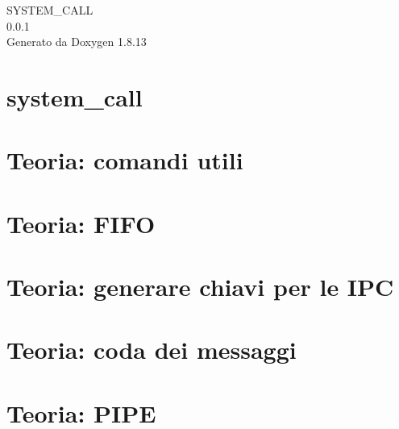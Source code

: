 \documentclass[twoside]{book}
\newcommand{\+}{\discretionary{\mbox{\scriptsize$\hookleftarrow$}}{}{}}
\newcommand{\clearemptydoublepage}{%
  \newpage{\pagestyle{empty}\cleardoublepage}%
}
\begin{document}
\hypersetup{pageanchor=false,
             bookmarksnumbered=true,
             pdfencoding=unicode
            }
\begin{titlepage}
\vspace*{7cm}
\begin{center}%
{\Large S\+Y\+S\+T\+E\+M\+\_\+\+C\+A\+LL \\[1ex]\large 0.\+0.\+1 }\\
\vspace*{1cm}
{\large Generato da Doxygen 1.8.13}\\
\end{center}
\end{titlepage}
\clearemptydoublepage
{}
\tableofcontents
\clearemptydoublepage
{}
\hypersetup{pageanchor=true}

\chapter{system\+\_\+call}
\label{index}\hypertarget{index}{}
\chapter{Teoria\+: comandi utili}
\label{md_theory_commands_commands}

\chapter{Teoria\+: F\+I\+FO}
\label{md_theory_fifo_fifo}

\chapter{Teoria\+: generare chiavi per le I\+PC}
\label{md_theory_generate_keys_generate_keys}

\chapter{Teoria\+: coda dei messaggi}
\label{md_theory_message_queue_message_queue}

\chapter{Teoria\+: P\+I\+PE}
\label{md_theory_pipe_pipe}

\end{document}
